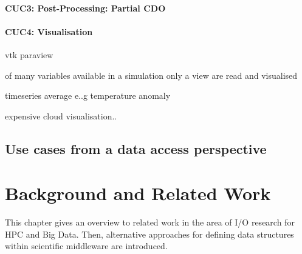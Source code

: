 \documentclass{../../template/esiwace-report}
\begin{document}
\subsubsection{CUC3: Post-Processing: Partial CDO}






\subsubsection{CUC4: Visualisation}



vtk
paraview


of many variables available in a simulation only a view are read and visualised

timeseries
average e..g temperature anomaly

expensive cloud visualisation..





\section{Use cases from a data access perspective}









\chapter{Background and Related Work}

\begin{chapterIntro}
This chapter gives an overview to related work in the area of I/O research for HPC and Big Data.
Then, alternative approaches for defining data structures within scientific middleware are introduced.
\end{chapterIntro}
\end{document}
